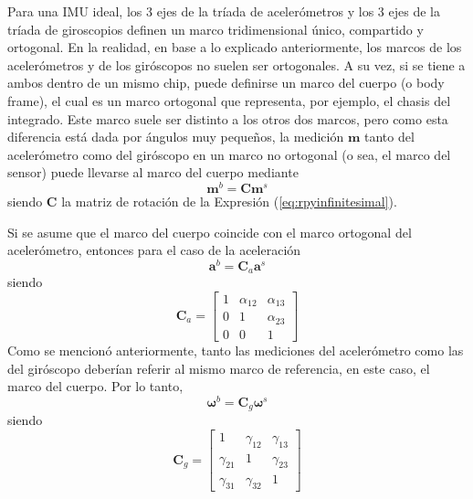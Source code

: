 Para una IMU ideal, los 3 ejes de la tríada de acelerómetros y los 3 ejes de la tríada de giroscopios definen un marco tridimensional único, compartido y ortogonal. En la realidad, en base a lo explicado anteriormente, los marcos de los acelerómetros y de los giróscopos no suelen ser ortogonales. A su vez, si se tiene a ambos dentro de un mismo chip, puede definirse un marco del cuerpo (o body frame), el cual es un marco ortogonal que representa, por ejemplo, el chasis del integrado. Este marco suele ser distinto a los otros dos marcos, pero como esta diferencia está dada por ángulos muy pequeños, la medición $\bm{m}$ tanto del acelerómetro como del giróscopo en un marco no ortogonal (o sea, el marco del sensor) puede llevarse al marco del cuerpo mediante
\begin{equation}
    \bm{m}^b = \bm{C}\bm{m}^s
\end{equation}
siendo $\bm{C}$ la matriz de rotación de la Expresión (\ref{eq:rpyinfinitesimal}).

Si se asume que el marco del cuerpo coincide con el marco ortogonal del acelerómetro, entonces para el caso de la aceleración
\begin{equation}
    \bm{a}^b = \bm{C}_a\bm{a}^s
\end{equation}
siendo
\begin{equation}
    \bm{C}_a =
    \begin{bmatrix}
        1 & \alpha_{12} & \alpha_{13} \\
        0 & 1 & \alpha_{23} \\
        0 & 0 & 1
    \end{bmatrix}
\end{equation}
Como se mencionó anteriormente, tanto las mediciones del acelerómetro como las del giróscopo deberían referir al mismo marco de referencia, en este caso, el marco del cuerpo. Por lo tanto,
\begin{equation}
    \bm{\omega}^b = \bm{C}_g\bm{\omega}^s
\end{equation}
siendo
\begin{equation}
    \bm{C}_g =
    \begin{bmatrix}
        1 & \gamma_{12} & \gamma_{13} \\
        \gamma_{21} & 1 & \gamma_{23} \\
        \gamma_{31} & \gamma_{32} & 1
    \end{bmatrix}
\end{equation}

